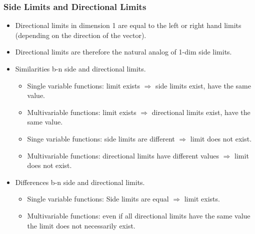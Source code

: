 \begin{frame}
\frametitle{Side Limits and Directional Limits}
\begin{itemize}
\item Directional limits in dimension 1 are equal to the left or right hand limits (depending on the direction of the vector).
\item<2-> Directional limits are therefore the natural analog of 1-dim side limits.
\item<3-> Similarities b-n side and directional limits.
\begin{itemize}
\item<3-> Single variable functions: limit exists $\Longrightarrow$ side limits exist, have the same value.
\item<4-> Multivariable functions: limit exists $\Longrightarrow$ directional limits exist, have the same value.
\item<5-> Singe variable functions: side limits are different $\Longrightarrow$ limit does not exist.
\item<6-> Multivariable functions: directional limits have different values $\Longrightarrow$ limit does not exist.
\end{itemize}
\item<7-> Differences b-n side and directional limits.
\begin{itemize}
\item<7-> Single variable functions: Side limits are equal $\Longrightarrow$ limit exists.
\item<8-> Multivariable functions: even if all directional limits have the same value the limit does not necessarily exist.
\end{itemize}
  
\end{itemize}

\end{frame}